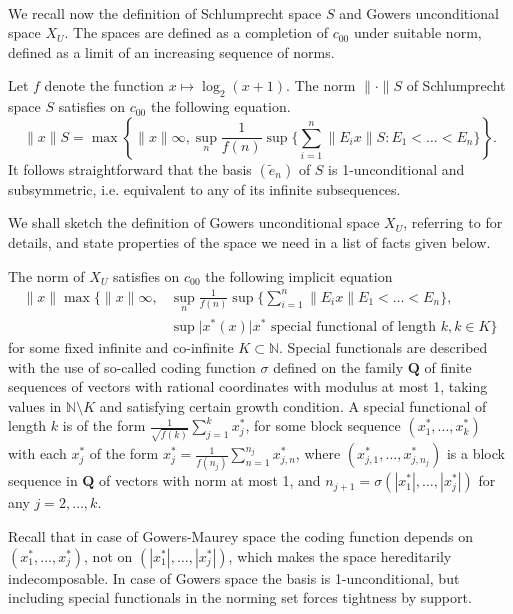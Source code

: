 \documentclass{amsart}
\numberwithin{subsection}{section}
\numberwithin{equation}{section}
\begin{document}
\

We recall now the definition of Schlumprecht space $S$ and Gowers unconditional space $X_U$. The spaces are defined as a completion of $c_{00}$ under suitable norm, defined as a limit of an increasing sequence of norms. 

Let $f$ denote the function $x\mapsto \log_2(x+1)$. The norm ${\lVert \cdot\rVert}S$ of Schlumprecht space $S$ satisfies on $c_{00}$ the following equation.
$$  
{\lVert x\rVert}S=\max\left\{{\lVert x\rVert}{\infty},\sup_{n}\frac{1}{f(n)}\sup\{\sum_{i=1}^{n}{\lVert E_{i}x\rVert}S: E_{1}<\dots<E_{n}\}\right\}.
$$
It follows straightforward that the basis $(\tilde{e}_n)$ of $S$ is 1-unconditional and subsymmetric, i.e. equivalent to any of its infinite subsequences. 

We shall sketch the definition of Gowers unconditional space $X_U$, referring to \cite{G} for details, and state properties of the space we need in a list of facts given below. 

The norm of $X_U$ satisfies on $c_{00}$ the following implicit equation
\begin{align*}
{\lVert x\rVert}\max\{{\lVert x\rVert}{\infty},&\sup_{n}\frac{1}{f(n)}\sup\{\sum_{i=1}^{n}{\lVert E_{i}x\rVert}  E_{1}<\dots<E_{n}\}, \\
  &\sup{\vert x^*(x)\vert} x^* \text{ special functional of length }k, k\in K\}
\end{align*}
for some fixed infinite and co-infinite $K\subset{{\mathbb{N}}}$. Special functionals are described with the use of so-called coding function $\sigma$ defined on the family $\mathbf{Q}$ of finite sequences of vectors with rational coordinates with modulus at most 1, taking values in ${{\mathbb{N}}}\setminus K$ and satisfying certain growth condition. A special functional of length $k$ is of the form $\frac{1}{\sqrt{f(k)}}\sum_{j=1}^kx_j^*$, for some block sequence $(x_1^*,\dots,x_k^*)$ with each $x_j^*$ of the form $x_j^*=\frac{1}{f(n_j)}\sum_{n=1}^{n_j}x_{j,n}^*$, where $(x_{j,1}^*, \dots, x_{j,n_j}^*)$ is a block sequence in $\textbf{Q}$ of vectors with norm at most 1, and  $n_{j+1}=\sigma(|x_1^*|, \dots, |x_j^*|)$ for any $j=2,\dots,k$. 

Recall that in case of Gowers-Maurey space the coding function depends on $(x_1^*, \dots, x_j^*)$, not on $(|x_1^*|, \dots, |x_j^*|)$, which  makes the space hereditarily indecomposable. In case of Gowers space the basis is 1-unconditional, but including special functionals in the norming set forces tightness by support. 
\end{document}
